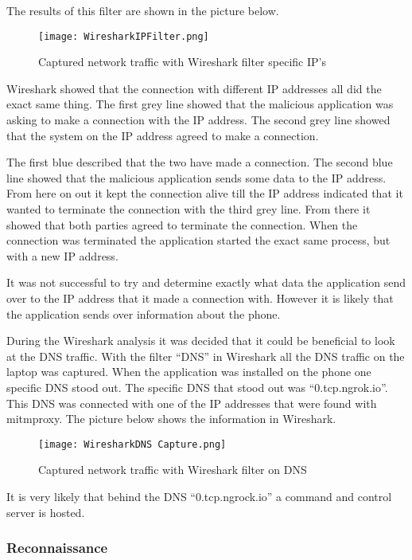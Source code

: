 The results of this filter are shown in the picture below.

\begin{figure}[H]
    \centering
    \texttt{[image: WiresharkIPFilter.png]}
    \caption{Captured network traffic with Wireshark filter specific IP's}
    \label{jordy-wiresharkfilter}
\end{figure}

Wireshark showed that the connection with different IP addresses all did the exact same thing.
The first grey line showed that the malicious application was asking to make a connection with the IP address.
The second grey line showed that the system on the IP address agreed to make a connection.
 
The first blue described that the two have made a connection.
The second blue line showed that the malicious application sends some data to the IP address.
From here on out it kept the connection alive till the IP address indicated that it wanted to terminate the connection with the third grey line.
From there it showed that both parties agreed to terminate the connection.
When the connection was terminated the application started the exact same process, but with a new IP address.

\newpage
It was not successful to try and determine exactly what data the application send over to the IP address that it made a connection with.
However it is likely that the application sends over information about the phone.

During the Wireshark analysis it was decided that it could be beneficial to look at the DNS traffic.
With the filter “DNS” in Wireshark all the DNS traffic on the laptop was captured.
When the application was installed on the phone one specific DNS stood out.
The specific DNS that stood out was “0.tcp.ngrok.io”.
This DNS was connected with one of the IP addresses that were found with mitmproxy.
The picture below shows the information in Wireshark.

\begin{figure}[H]
    \centering
    \texttt{[image: WiresharkDNS Capture.png]}
    \caption{Captured network traffic with Wireshark filter on DNS}
    \label{jordy-wiresharkDNS}
\end{figure}

It is very likely that behind the DNS “0.tcp.ngrock.io” a command and control server is hosted.

\subsubsection{Reconnaissance}

